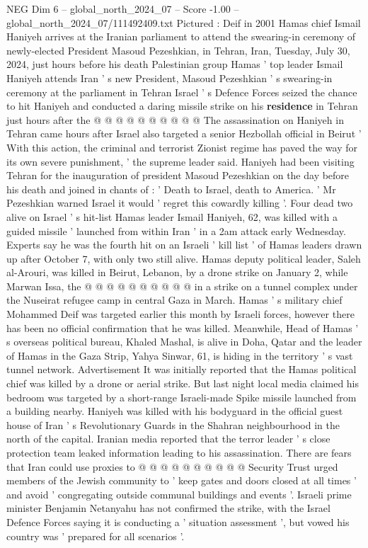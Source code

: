 \begin{textsample}{NEG Dim 6 – global\_north\_2024\_07 – Score -1.00 – global\_north\_2024\_07/111492409.txt}
Pictured : Deif in 2001 Hamas chief Ismail Haniyeh arrives at the Iranian parliament to attend the swearing-in ceremony of newly-elected President Masoud Pezeshkian, in Tehran, Iran, Tuesday, July 30, 2024, just hours before his death Palestinian group Hamas ' top leader Ismail Haniyeh attends Iran ' s new President, Masoud Pezeshkian ' s swearing-in ceremony at the parliament in Tehran Israel ' s Defence Forces seized the chance to hit Haniyeh and conducted a daring missile strike on his \textbf{residence} in Tehran just hours after the @ @ @ @ @ @ @ @ @ @ The assassination on Haniyeh in Tehran came hours after Israel also targeted a senior Hezbollah official in Beirut ' With this action, the criminal and terrorist Zionist regime has paved the way for its own severe punishment, ' the supreme leader said.
Haniyeh had been visiting Tehran for the inauguration of president Masoud Pezeshkian on the day before his death and joined in chants of : ' Death to Israel, death to America. ' Mr Pezeshkian warned Israel it would ' regret this cowardly killing '.
Four dead two alive on Israel ' s hit-list Hamas leader Ismail Haniyeh, 62, was killed with a guided missile ' launched from within Iran ' in a 2am attack early Wednesday.
Experts say he was the fourth hit on an Israeli ' kill list ' of Hamas leaders drawn up after October 7, with only two still alive.
Hamas deputy political leader, Saleh al-Arouri, was killed in Beirut, Lebanon, by a drone strike on January 2, while Marwan Issa, the @ @ @ @ @ @ @ @ @ @ in a strike on a tunnel complex under the Nuseirat refugee camp in central Gaza in March.
Hamas ' s military chief Mohammed Deif was targeted earlier this month by Israeli forces, however there has been no official confirmation that he was killed.
Meanwhile, Head of Hamas ' s overseas political bureau, Khaled Mashal, is alive in Doha, Qatar and the leader of Hamas in the Gaza Strip, Yahya Sinwar, 61, is hiding in the territory ' s vast tunnel network.
Advertisement It was initially reported that the Hamas political chief was killed by a drone or aerial strike.
But last night local media claimed his bedroom was targeted by a short-range Israeli-made Spike missile launched from a building nearby.
Haniyeh was killed with his bodyguard in the official guest house of Iran ' s Revolutionary Guards in the Shahran neighbourhood in the north of the capital.
Iranian media reported that the terror leader ' s close protection team leaked information leading to his assassination.
There are fears that Iran could use proxies to @ @ @ @ @ @ @ @ @ @ Security Trust urged members of the Jewish community to ' keep gates and doors closed at all times ' and avoid ' congregating outside communal buildings and events '.
Israeli prime minister Benjamin Netanyahu has not confirmed the strike, with the Israel Defence Forces saying it is conducting a ' situation assessment ', but vowed his country was ' prepared for all scenarios '.

\end{textsample}
